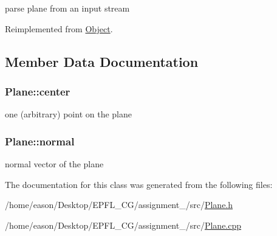 parse plane from an input stream 



Reimplemented from \hyperlink{structObject_ae7828b080c96e2226f3dc19823161d41}{Object}.



\subsection{Member Data Documentation}
\subsubsection[{\texorpdfstring{center}{center}}]{ Plane\+::center\hspace{0.3cm}{\ttfamily [private]}}\hypertarget{classPlane_a366eef1f4daccfc48ccd824cca63a026}{}\label{classPlane_a366eef1f4daccfc48ccd824cca63a026}


one (arbitrary) point on the plane 

\subsubsection[{\texorpdfstring{normal}{normal}}]{ Plane\+::normal\hspace{0.3cm}{\ttfamily [private]}}\hypertarget{classPlane_ac3a6d80b28df1dd0ef7867663227c937}{}\label{classPlane_ac3a6d80b28df1dd0ef7867663227c937}


normal vector of the plane 



The documentation for this class was generated from the following files\+:\begin{DoxyCompactItemize}
\item 
/home/eason/\+Desktop/\+E\+P\+F\+L\+\_\+\+C\+G/assignment\+\_/src/\hyperlink{Plane_8h}{Plane.\+h}\item 
/home/eason/\+Desktop/\+E\+P\+F\+L\+\_\+\+C\+G/assignment\+\_/src/\hyperlink{Plane_8cpp}{Plane.\+cpp}\end{DoxyCompactItemize}
